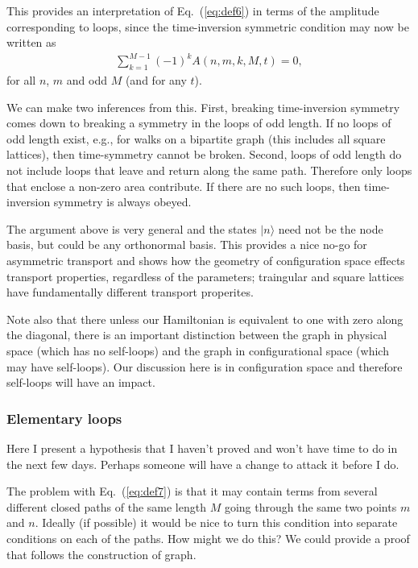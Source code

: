 \documentclass[aps,pra,12pt,nofootinbib,superscriptaddress,longbibliography,showpacs]{revtex4-1}
\theoremstyle{plain}
\theoremstyle{definition}
\newcommand{\ket}[1]{\ensuremath{|#1\rangle}}
\newcommand{\eqr}[1]{Eq.~(\ref{#1})}
\begin{document}
This provides an interpretation of \eqr{eq:def6} in terms of the amplitude corresponding to loops, since the time-inversion symmetric condition may now be written as
\begin{align}
\label{eq:def7}
  \sum_{k=1 }^{M-1} (-1)^k  A(n,m,k,M,t)   = 0 ,
\end{align}
for all $n$, $m$ and odd $M$ (and for any $t$). 

We can make two inferences from this. First, breaking time-inversion symmetry comes down to breaking a symmetry in the loops of odd length. If no loops of odd length exist, e.g., for walks on a bipartite graph (this includes all square lattices), then time-symmetry cannot be broken. Second, loops of odd length do not include loops that leave and return along the same path. Therefore only loops that enclose a non-zero area contribute. If there are no such loops, then time-inversion symmetry is always obeyed.

The argument above is very general and the states $\ket{n}$ need not be the node basis, but could be any orthonormal basis. This provides a nice no-go for asymmetric transport and shows how the geometry of configuration space effects transport properties, regardless of the parameters; traingular and square lattices have fundamentally different transport properites.

Note also that there unless our Hamiltonian is equivalent to one with zero along the diagonal, there is an important distinction between the graph in physical space (which has no self-loops) and the graph in configurational space (which may have self-loops). Our discussion here is in configuration space and therefore self-loops will have an impact.

\subsubsection{Elementary loops}
Here I present a hypothesis that I haven't proved and won't have time to do in the next few days. Perhaps someone will have a change to attack it before I do.

The problem with \eqr{eq:def7} is that it may contain terms from several different closed paths of the same length $M$ going through the same two points $m$ and $n$. Ideally (if possible) it would be nice to turn this condition into separate conditions on each of the paths. How might we do this? We could provide a proof that follows the construction of graph. 
\end{document}
